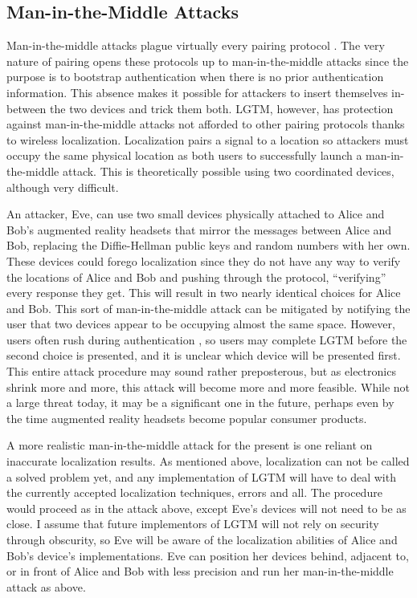 \documentclass[12pt]{report}
\begin{document}
\subsection{Man-in-the-Middle Attacks}
Man-in-the-middle attacks plague virtually every pairing protocol \cite{ConferenceCompStudySecurePairingKumar2009}. The very nature of pairing opens these protocols up to man-in-the-middle attacks since the purpose is to bootstrap authentication when there is no prior authentication information. This absence makes it possible for attackers to insert themselves in-between the two devices and trick them both. LGTM, however, has protection against man-in-the-middle attacks not afforded to other pairing protocols thanks to wireless localization. Localization pairs a signal to a location so attackers must occupy the same physical location as both users to successfully launch a man-in-the-middle attack. This is theoretically possible using two coordinated devices, although very difficult. \par

An attacker, Eve, can use two small devices physically attached to Alice and Bob's augmented reality headsets that mirror the messages between Alice and Bob, replacing the Diffie-Hellman public keys and random numbers with her own. These devices could forego localization since they do not have any way to verify the locations of Alice and Bob and pushing through the protocol, ``verifying'' every response they get. This will result in two nearly identical choices for Alice and Bob. This sort of man-in-the-middle attack can be mitigated by notifying the user that two devices appear to be occupying almost the same space. However, users often rush during authentication \cite{PairingInterfaceConstrainedRushingSaxena2009}, so users may complete LGTM before the second choice is presented, and it is unclear which device will be presented first. This entire attack procedure may sound rather preposterous, but as electronics shrink more and more, this attack will become more and more feasible. While not a large threat today, it may be a significant one in the future, perhaps even by the time augmented reality headsets become popular consumer products. \par

A more realistic man-in-the-middle attack for the present is one reliant on inaccurate localization results. As mentioned above, localization can not be called a solved problem yet, and any implementation of LGTM will have to deal with the currently accepted localization techniques, errors and all. The procedure would proceed as in the attack above, except Eve's devices will not need to be as close. I assume that future implementors of LGTM will not rely on security through obscurity, so Eve will be aware of the localization abilities of Alice and Bob's device's implementations. Eve can position her devices behind, adjacent to, or in front of Alice and Bob with less precision and run her man-in-the-middle attack as above. \par
\end{document}
